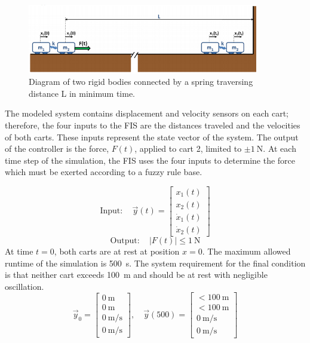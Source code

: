 \begin{figure}
    \centering
    \includegraphics[width=0.9\textwidth]{images/model.png}
    \caption{Diagram of two rigid bodies connected by a spring traversing distance \textrm{L} in minimum
    time.} \label{f:model}
\end{figure}

The modeled system contains displacement and velocity sensors on each cart; therefore, the four inputs to the
FIS are the distances traveled and the velocities of both carts. These inputs represent the state vector of
the system. The output of the controller is the force, $F(t)$, applied to cart 2, limited to $\pm
\SI{1}{\newton}$. At each time step of the simulation, the FIS uses the four inputs to determine the force
which must be exerted according to a fuzzy rule base. 

\begin{displaymath}
    \mathrm{Input:}\quad \vec{y}(t)= \begin{bmatrix} x_{1}(t)\\ x_{2}(t)\\ \dot{x}_{1}(t)\\
\dot{x}_{2}(t) \end{bmatrix}
\end{displaymath}
\begin{displaymath} \mathrm{Output:}\quad |F(t)|\le
\SI{1}{\newton}
\end{displaymath}
At time $t=0$, both carts are at rest at position
$x=0$. The maximum allowed runtime of the simulation is \SI{500}{\second}. The system requirement for the
final condition is that neither cart exceeds \SI{100}{\metre} and should be at rest with negligible
oscillation. 
\begin{displaymath} \vec{y}_0=\begin{bmatrix}
\SI{0}{\metre}\\\SI{0}{\metre}\\\SI{0}{\metre\per\second}\\\SI{0}{\metre\per\second} \end{bmatrix},\quad
\vec{y}(500)=\begin{bmatrix} <\SI{100}{\metre}\\ <\SI{100}{\metre}\\ \SI{0}{\metre\per\second}\\
\SI{0}{\metre\per\second} \end{bmatrix}
\end{displaymath}

